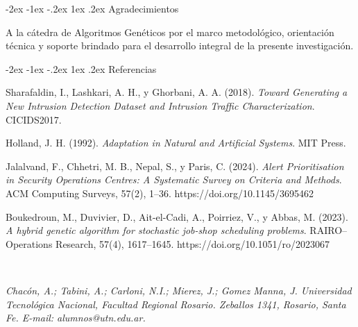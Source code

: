 \documentclass[12pt,a4paper,twocolumn]{article}
\makeatletter
\renewcommand{\section}{\@startsection{section}{1}{\z@}%
  {-2ex \@plus -1ex \@minus -.2ex}%
  {1ex \@plus.2ex}%
  {\fontsize{12}{14}\selectfont\bfseries}}
\makeatother
\begin{document}
\section{Agradecimientos}
{\fontsize{10}{12}\selectfont
A la cátedra de Algoritmos Genéticos por el marco metodológico, orientación técnica y soporte brindado para el desarrollo integral de la presente investigación.
\par}

\section{Referencias}
{\fontsize{10}{12}\selectfont
\noindent [1] Sharafaldin, I., Lashkari, A. H., y Ghorbani, A. A. (2018). \textit{Toward Generating a New Intrusion Detection Dataset and Intrusion Traffic Characterization}. CICIDS2017.

\noindent [2] Holland, J. H. (1992). \textit{Adaptation in Natural and Artificial Systems}. MIT Press.

\noindent [3] Jalalvand, F., Chhetri, M. B., Nepal, S., y Paris, C. (2024). \textit{Alert Prioritisation in Security Operations Centres: A Systematic Survey on Criteria and Methods}. ACM Computing Surveys, 57(2), 1--36. https://doi.org/10.1145/3695462

\noindent [4] Boukedroun, M., Duvivier, D., Ait-el-Cadi, A., Poirriez, V., y Abbas, M. (2023). \textit{A hybrid genetic algorithm for stochastic job-shop scheduling problems}. RAIRO--Operations Research, 57(4), 1617--1645. https://doi.org/10.1051/ro/2023067
\par}

\vspace{1.5em}

\ifdefined\anonymousversion
\else
\\
{\fontsize{10}{12}\selectfont\itshape 
Chacón, A.; Tabini, A.; Carloni, N.I.; Mierez, J.; Gomez Manna, J. Universidad Tecnológica Nacional, Facultad Regional Rosario. Zeballos 1341, Rosario, Santa Fe. E-mail: alumnos@utn.edu.ar.
\par}
\fi
\end{document}
